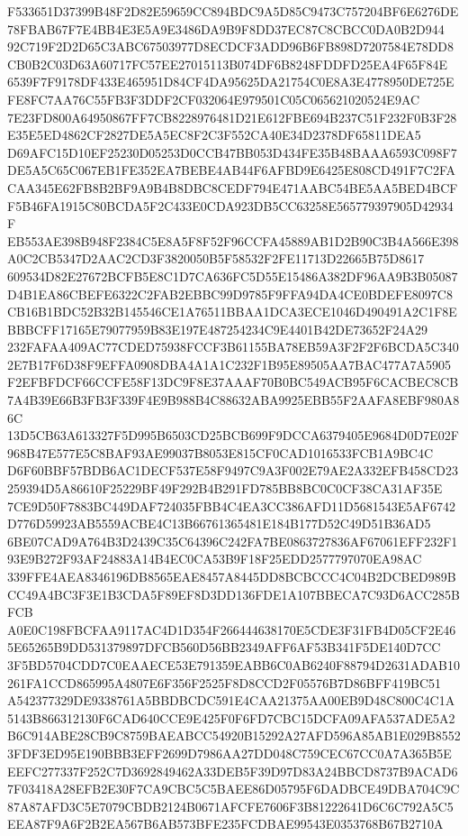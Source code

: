\documentclass[UTF8,fontset=fandol,zihao=-4,a4paper]{ctexart}
\begin{document}
{{F533651D37399B48F2D82E59659CC894BDC9A5D85C9473C757204BF6E6276DE78FBAB67F7E4BB4E3E5A9E3486DA9B9F8DD37EC87C8CBCC0DA0B2D944
92C719F2D2D65C3ABC67503977D8ECDCF3ADD96B6FB898D7207584E78DD8CB0B2C03D63A60717FC57EE27015113B074DF6B8248FDDFD25EA4F65F84E
6539F7F9178DF433E465951D84CF4DA95625DA21754C0E8A3E4778950DE725EFE8FC7AA76C55FB3F3DDF2CF032064E979501C05C065621020524E9AC
7E23FD800A64950867FF7CB8228976481D21E612FBE694B237C51F232F0B3F28E35E5ED4862CF2827DE5A5EC8F2C3F552CA40E34D2378DF65811DEA5
D69AFC15D10EF25230D05253D0CCB47BB053D434FE35B48BAAA6593C098F7DE5A5C65C067EB1FE352EA7BEBE4AB44F6AFBD9E6425E808CD491F7C2FA
CAA345E62FB8B2BF9A9B4B8DBC8CEDF794E471AABC54BE5AA5BED4BCFF5B46FA1915C80BCDA5F2C433E0CDA923DB5CC63258E565779397905D42934F
EB553AE398B948F2384C5E8A5F8F52F96CCFA45889AB1D2B90C3B4A566E398A0C2CB5347D2AAC2CD3F3820050B5F58532F2FE11713D22665B75D8617
609534D82E27672BCFB5E8C1D7CA636FC5D55E15486A382DF96AA9B3B05087D4B1EA86CBEFE6322C2FAB2EBBC99D9785F9FFA94DA4CE0BDEFE8097C8
CB16B1BDC52B32B145546CE1A76511BBAA1DCA3ECE1046D490491A2C1F8EBBBCFF17165E79077959B83E197E487254234C9E4401B42DE73652F24A29
232FAFAA409AC77CDED75938FCCF3B61155BA78EB59A3F2F2F6BCDA5C3402E7B17F6D38F9EFFA0908DBA4A1A1C232F1B95E89505AA7BAC477A7A5905
F2EFBFDCF66CCFE58F13DC9F8E37AAAF70B0BC549ACB95F6CACBEC8CB7A4B39E66B3FB3F339F4E9B988B4C88632ABA9925EBB55F2AAFA8EBF980A86C
13D5CB63A613327F5D995B6503CD25BCB699F9DCCA6379405E9684D0D7E02F968B47E577E5C8BAF93AE99037B8053E815CF0CAD1016533FCB1A9BC4C
D6F60BBF57BDB6AC1DECF537E58F9497C9A3F002E79AE2A332EFB458CD23259394D5A86610F25229BF49F292B4B291FD785BB8BC0C0CF38CA31AF35E
7CE9D50F7883BC449DAF724035FBB4C4EA3CC386AFD11D5681543E5AF6742D776D59923AB5559ACBE4C13B66761365481E184B177D52C49D51B36AD5
6BE07CAD9A764B3D2439C35C64396C242FA7BE0863727836AF67061EFF232F193E9B272F93AF24883A14B4EC0CA53B9F18F25EDD2577797070EA98AC
339FFE4AEA8346196DB8565EAE8457A8445DD8BCBCCC4C04B2DCBED989BCC49A4BC3F3E1B3CDA5F89EF8D3DD136FDE1A107BBECA7C93D6ACC285BFCB
A0E0C198FBCFAA9117AC4D1D354F266444638170E5CDE3F31FB4D05CF2E465E65265B9DD531379897DFCB560D56BB2349AFF6AF53B341F5DE140D7CC
3F5BD5704CDD7C0EAAECE53E791359EABB6C0AB6240F88794D2631ADAB10261FA1CCD865995A4807E6F356F2525F8D8CCD2F05576B7D86BFF419BC51
A542377329DE9338761A5BBDBCDC591E4CAA21375AA00EB9D48C800C4C1A5143B866312130F6CAD640CCE9E425F0F6FD7CBC15DCFA09AFA537ADE5A2
B6C914ABE28CB9C8759BAEABCC54920B15292A27AFD596A85AB1E029B85523FDF3ED95E190BBB3EFF2699D7986AA27DD048C759CEC67CC0A7A365B5E
EEFC277337F252C7D3692849462A33DEB5F39D97D83A24BBCD8737B9ACAD67F03418A28EFB2E30F7CA9CBC5C5BAEE86D05795F6DADBCE49DBA704C9C
87A87AFD3C5E7079CBDB2124B0671AFCFE7606F3B81222641D6C6C792A5C5EEA87F9A6F2B2EA567B6AB573BFE235FCDBAE99543E0353768B67B2710A
}}
\end{document}
